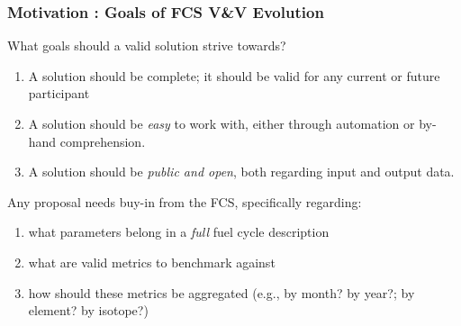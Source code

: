 \begin{frame}[ctb!]
  \frametitle{Motivation : Goals of FCS V\&V Evolution}
  What goals should a valid solution strive towards?
  \begin{enumerate}
    \item A solution should be complete; it should be valid for any current or
      future participant
    \item A solution should be \textit{easy} to work with, either through
      automation or by-hand comprehension.
    \item A solution should be \textit{public and open}, both regarding input
      and output data.
  \end{enumerate}

  Any proposal needs buy-in from the FCS, specifically regarding:
  \begin{enumerate}
    \item what parameters belong in a \textit{full} fuel cycle description
    \item what are valid metrics to benchmark against
    \item how should these metrics be aggregated (e.g., by month? by year?; by
      element? by isotope?)
  \end{enumerate}
\end{frame}
